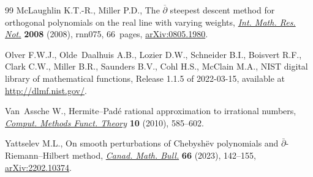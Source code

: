 \documentclass[11pt]{article}
\numberwithin{equation}{section}
\numberwithin{equation}{section}
\begin{document}
\begin{thebibliography}{99}
McLaughlin K.T.-R., Miller P.D., The {$\overline{\partial}$} steepest descent
 method for orthogonal polynomials on the real line with varying weights,
 \href{https://doi.org/10.1093/imrn/rnn075}{\textit{Int. Math. Res. Not.}} \textbf{2008} (2008), rnn075, 66~pages,
 \href{https://arxiv.org/abs/0805.1980}{arXiv:0805.1980}.

Olver F.W.J., Olde~Daalhuis A.B., Lozier D.W., Schneider B.I., Boisvert R.F.,
 Clark C.W., Miller B.R., Saunders B.V., Cohl H.S., McClain M.A., {NIST}
 digital library of mathematical functions, {R}elease 1.1.5 of 2022-03-15,
 available at \url{http://dlmf.nist.gov/}.

Van~Assche W., Hermite--{P}ad\'{e} rational approximation to irrational
 numbers, \href{https://doi.org/10.1007/BF03321782}{\textit{Comput. Methods Funct. Theory}} \textbf{10} (2010), 585--602.

Yattselev M.L., On smooth perturbations of {C}hebysh\"{e}v polynomials and {$
 \bar {\partial } $}-{R}iemann--{H}ilbert method, \href{https://doi.org/10.4153/S0008439522000145}{\textit{Canad. Math. Bull.}}
 \textbf{66} (2023), 142--155, \href{https://arxiv.org/abs/2202.10374}{arXiv:2202.10374}.

\end{thebibliography}
\end{document}
